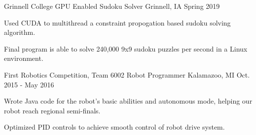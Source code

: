 \documentclass[12pt, a4paper]{awesome-cv}
\begin{document}
\begin{cventries}



  \cventry
    {Grinnell College}
    {GPU Enabled Sudoku Solver}
    {Grinnell, IA}
    {Spring 2019}
    {
	\begin{cvitems}
	  \item{Used CUDA to multithread a constraint propogation based sudoku solving algorithm.}
	  \item{Final program is able to solve 240,000 9x9 sudoku puzzles per second in a Linux environment.}
	\end{cvitems}
    }

  \cventry
    {First Robotics Competition, Team 6002}
    {Robot Programmer}
    {Kalamazoo, MI}
    {Oct. 2015 - May 2016}
    {
      \begin{cvitems}
        \item {Wrote Java code for the robot’s basic abilities and autonomous mode, helping our robot reach regional semi-finals.}
        \item {Optimized PID controls to achieve smooth control of robot drive system.}
      \end{cvitems}
    }



\end{cventries}
\end{document}
